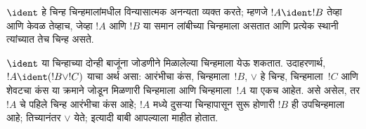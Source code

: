 \documentclass[../../../include/open-logic-section]{subfiles}
\begin{document}
\begin{defn}[विन्यासात्मक अनन्यता]
$\ident$ हे चिन्ह चिन्हमालांमधील विन्यासात्मक अनन्यता व्यक्त करते;
म्हणजे $!A \ident !B$ तेव्हा आणि केवळ तेव्हाच, जेव्हा $!A$ आणि $!B$
या समान लांबीच्या चिन्हमाला असतात आणि प्रत्येक स्थानी त्यांच्यात तेच
चिन्ह असते.
\end{defn}

$\ident$ या चिन्हाच्या दोन्ही बाजूंना जोडणीने मिळालेल्या चिन्हमाला
येऊ शकतात. उदाहरणार्थ, $!A \ident (!B \lor !C)$ याचा अर्थ असा:
आरंभीचा कंस, चिन्हमाला~$!B$, $\lor$ हे चिन्ह, चिन्हमाला~$!C$ आणि
शेवटचा कंस या क्रमाने जोडून मिळणारी चिन्हमाला आणि चिन्हमाला~$!A$
या एकच आहेत. असे असेल, तर $!A$ चे पहिले चिन्ह आरंभीचा कंस आहे;
$!A$ मध्ये दुसऱ्या चिन्हापासून सुरू होणारी $!B$ ही उपचिन्हमाला आहे;
तिच्यानंतर $\lor$ येते; इत्यादी बाबी आपल्याला माहीत होतात.
\end{document}

